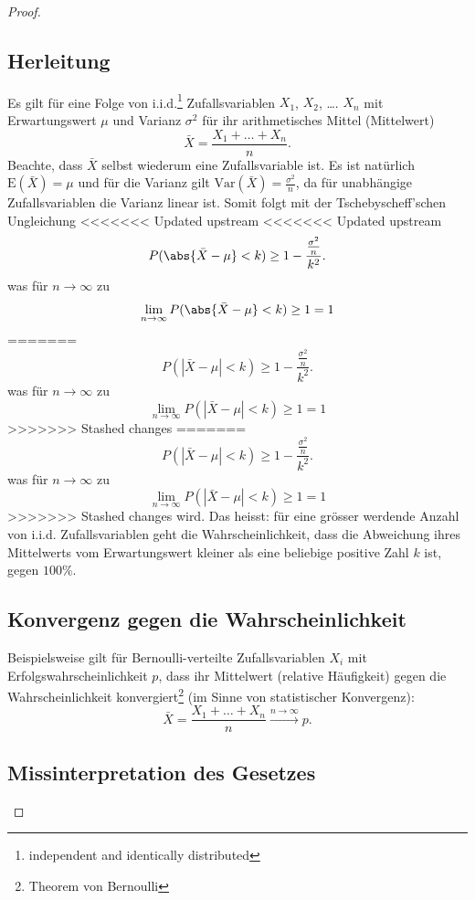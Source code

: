 \documentclass[%
<<<<<<< Updated upstream
<<<<<<< Updated upstream
11pt,%
twoside,%
titlepage,%
german,%
=======
=======
>>>>>>> Stashed changes
11pt,%
twoside,%
titlepage,%
swissgerman,%
<<<<<<< Updated upstream
>>>>>>> Stashed changes
=======
>>>>>>> Stashed changes
headsepline%
]{scrartcl}
\theoremstyle{definition}
\theoremstyle{plain}
\begin{document}
\begin{proof}
\subsection{Herleitung}

Es gilt für eine Folge von i.i.d.\footnote{independent and identically distributed} Zufallsvariablen $X_1$, $X_2$, \dots. $X_n$ mit Erwartungswert $\mu$ und Varianz $\sigma^2$ für ihr arithmetisches Mittel (Mittelwert)
$$\bar{X}=\frac{X_1+\dots+X_n}{n}.$$
Beachte, dass $\bar{X}$ selbst wiederum eine Zufallsvariable ist. Es ist natürlich $\mathrm{E}(\bar{X})=\mu$ und für die Varianz gilt $\mathrm{Var}(\bar{X})=\frac{\sigma^2}{n}$, da für unabhängige Zufallsvariablen die Varianz linear ist. Somit folgt mit der Tschebyscheff'schen Ungleichung
<<<<<<< Updated upstream
<<<<<<< Updated upstream
$$P(\abs{\bar{X}-\mu}<k) \geq 1-\frac{\frac{\sigma^2}{n}}{k^2}.$$
was für $n\to\infty$ zu
$$\lim_{n\to\infty}P(\abs{\bar{X}-\mu}<k) \geq 1=1$$
=======
$$P(|{\bar{X}-\mu}|<k) \geq 1-\frac{\frac{\sigma^2}{n}}{k^2}.$$
was für $n\to\infty$ zu
$$\lim_{n\to\infty}P(|{\bar{X}-\mu}|<k) \geq 1=1$$
>>>>>>> Stashed changes
=======
$$P(|{\bar{X}-\mu}|<k) \geq 1-\frac{\frac{\sigma^2}{n}}{k^2}.$$
was für $n\to\infty$ zu
$$\lim_{n\to\infty}P(|{\bar{X}-\mu}|<k) \geq 1=1$$
>>>>>>> Stashed changes
wird. Das heisst: für eine grösser werdende Anzahl von i.i.d. Zufallsvariablen geht die Wahrscheinlichkeit, dass die Abweichung ihres Mittelwerts vom Erwartungswert kleiner als eine beliebige positive Zahl $k$ ist, gegen $100\%$.

\subsection{Konvergenz gegen die Wahrscheinlichkeit}

Beispielsweise gilt für Bernoulli-verteilte Zufallsvariablen $X_i$ mit Erfolgswahrscheinlichkeit $p$, dass ihr Mittelwert (relative Häufigkeit) gegen die Wahrscheinlichkeit konvergiert\footnote{Theorem von Bernoulli} (im Sinne von statistischer Konvergenz):
$$\bar{X}=\frac{X_1+\dots+X_n}{n}\stackrel{n\to\infty}{\longrightarrow}p.$$



\subsection{Missinterpretation des Gesetzes}


\end{proof}
\end{document}
